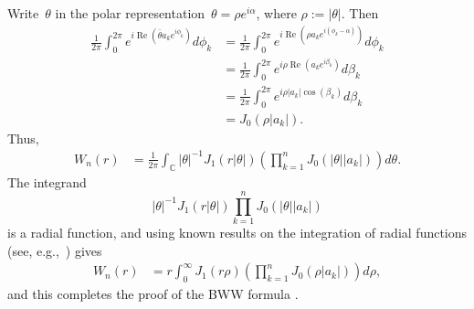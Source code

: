 \documentclass[final ]{IEEEtran}
\newcommand {\C}{\mathbb C}
\renewcommand{\Re}{\operatorname{Re}}
\renewcommand{\Re}{\operatorname{Re}}
\begin{document}
Write~$ \theta$ in the polar representation~$   \theta=\rho e^{i \alpha }$, where $\rho:=|\theta|$. Then
\begin{align*}
 \frac1{2\pi}  \int_0^{2\pi } e^{i\Re  (\bar\theta  a_k e^{i\phi_k}  )}d\phi_k &=\frac1{2\pi}
  \int_0^{2\pi }  e^{i\Re  ( \rho a_k   e^{i(\phi_k-\alpha)}  )}d\phi_k\\
  &=\frac1{2\pi}  \int_0^{2\pi }  e^{i \rho \Re  (  a_k   e^{i \beta_k  }  )}d\beta_k\\
  &= \frac1{2\pi}  \int_0^{2\pi }  e^{i \rho   |a_k|  \cos(\beta_k)  }d\beta_k\\
  &= J_0(\rho |a_k|).
\end{align*}
Thus,
\begin{align*}
W_n(r)
&= \frac{1}{ 2\pi }   \int_\C |\theta|^{-1} J_1(r|\theta|)\left (  \prod_{k=1}^n J_0(|\theta| |a_k|)   \right)  d\theta  .
\end{align*}
 The integrand
 \[
 |\theta|^{-1} J_1(r|\theta|) \prod_{k=1}^n J_0(|\theta| |a_k|)
 \]
 is a radial function, and using known results on the integration of radial functions (see, e.g.,~\cite[Chapter~6]{real_analysis_stromberg})
gives
\begin{align*}
W_n(r)
&=  r \int_0^\infty  J_1(r \rho ) \left (  \prod_{k=1}^n  J_0(\rho |a_k|)    \right)  d\rho,
\end{align*}
and this completes the proof of the BWW formula .




%
%
\end{document}
